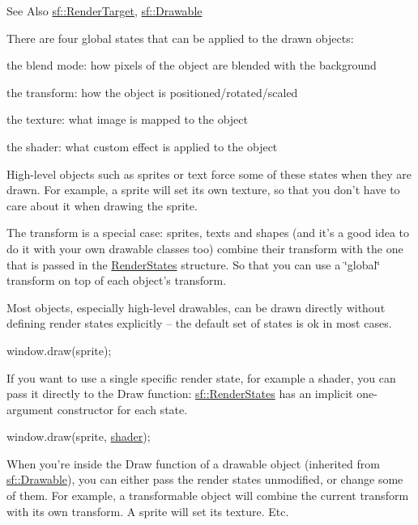 \begin{DoxySeeAlso}{See Also}
\hyperlink{classsf_1_1_render_target}{sf\-::\-Render\-Target}, \hyperlink{classsf_1_1_drawable}{sf\-::\-Drawable}
\end{DoxySeeAlso}
There are four global states that can be applied to the drawn objects\-: \begin{DoxyItemize}
\item the blend mode\-: how pixels of the object are blended with the background \item the transform\-: how the object is positioned/rotated/scaled \item the texture\-: what image is mapped to the object \item the shader\-: what custom effect is applied to the object\end{DoxyItemize}
High-\/level objects such as sprites or text force some of these states when they are drawn. For example, a sprite will set its own texture, so that you don't have to care about it when drawing the sprite.

The transform is a special case\-: sprites, texts and shapes (and it's a good idea to do it with your own drawable classes too) combine their transform with the one that is passed in the \hyperlink{classsf_1_1_render_states}{Render\-States} structure. So that you can use a \char`\"{}global\char`\"{} transform on top of each object's transform.

Most objects, especially high-\/level drawables, can be drawn directly without defining render states explicitly -- the default set of states is ok in most cases. 
\begin{DoxyCode}
window.draw(sprite);
\end{DoxyCode}


If you want to use a single specific render state, for example a shader, you can pass it directly to the Draw function\-: \hyperlink{classsf_1_1_render_states}{sf\-::\-Render\-States} has an implicit one-\/argument constructor for each state. 
\begin{DoxyCode}
window.draw(sprite, \hyperlink{classsf_1_1_render_states_a30e00c9f28ca246ae73119975255ebd0}{shader});
\end{DoxyCode}


When you're inside the Draw function of a drawable object (inherited from \hyperlink{classsf_1_1_drawable}{sf\-::\-Drawable}), you can either pass the render states unmodified, or change some of them. For example, a transformable object will combine the current transform with its own transform. A sprite will set its texture. Etc.

